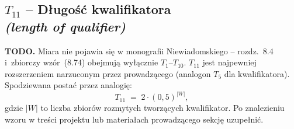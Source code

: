 \subsection*{$T_{11}$ -- Długość kwalifikatora \\
\textit{(length of qualifier)}}

\textbf{TODO.} Miara nie pojawia się w monografii Niewiadomskiego
\cite{niewiadomski2008} -- rozdz.~8.4 i~zbiorczy wzór~(8.74) obejmują
wyłącznie $T_1$--$T_{10}$. $T_{11}$ jest najpewniej rozszerzeniem
narzuconym przez prowadzącego (analogon $T_5$ dla kwalifikatora).
Spodziewana postać przez analogię:
\[
    T_{11} \;=\; 2 \cdot (0{,}5)^{|W|},
\]
gdzie $|W|$ to liczba zbiorów rozmytych tworzących kwalifikator.
Po znalezieniu wzoru w treści projektu lub materiałach prowadzącego
sekcję uzupełnić.

